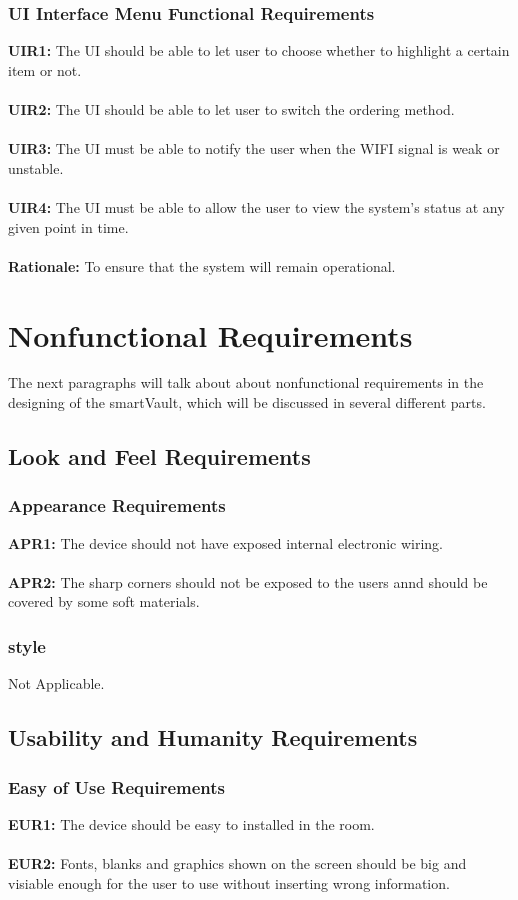 \documentclass[12pt]{article}
\begin{document}
\subsubsection{UI Interface Menu Functional Requirements}
\textbf{UIR1:} The UI should be able to let user to choose whether to highlight a certain item or not.\\\\
\textbf{UIR2:} The UI should be able to let user to switch the ordering method.\\\\
\textbf{UIR3:} The UI must be able to notify the user when the WIFI signal is weak or unstable.\\\\
\textbf{UIR4:} The UI must be able to allow the user to view the system’s status at any given point in time.\\\\
\textbf{Rationale:} To ensure that the system will remain operational.






\section{Nonfunctional Requirements}
The next paragraphs will talk about about nonfunctional requirements in the designing of the smartVault, which will be discussed in several different parts. 
\subsection{Look and Feel Requirements}
\subsubsection{Appearance Requirements}
\textbf{APR1:} The device should not have exposed internal electronic wiring.\\\\
\textbf{APR2:} The sharp corners should not be exposed to the users annd should be covered by some soft materials.
\subsubsection{style}
Not Applicable.
\subsection{Usability and Humanity Requirements}
\subsubsection{Easy of Use Requirements}
\textbf{EUR1:} The device should be easy to installed in the room.\\\\
\textbf{EUR2:} Fonts, blanks and graphics shown on the screen should be big and visiable enough for the user to use without inserting wrong information.
\end{document}
